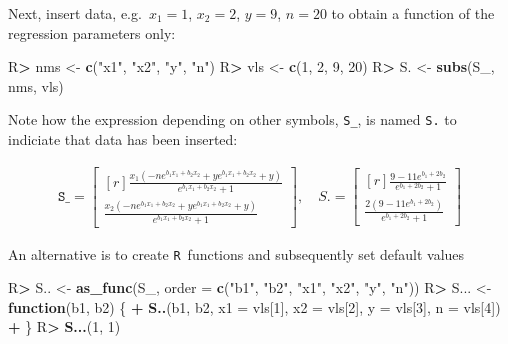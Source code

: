 \documentclass[10pt,]{article}
\newenvironment{Shaded}{\begin{snugshade}}{\end{snugshade}}
\newcommand{\ControlFlowTok}[1]{\textcolor[rgb]{0.13,0.29,0.53}{\textbf{#1}}}
\newcommand{\DataTypeTok}[1]{\textcolor[rgb]{0.13,0.29,0.53}{#1}}
\newcommand{\DecValTok}[1]{\textcolor[rgb]{0.00,0.00,0.81}{#1}}
\newcommand{\KeywordTok}[1]{\textcolor[rgb]{0.13,0.29,0.53}{\textbf{#1}}}
\newcommand{\NormalTok}[1]{#1}
\newcommand{\OperatorTok}[1]{\textcolor[rgb]{0.81,0.36,0.00}{\textbf{#1}}}
\newcommand{\StringTok}[1]{\textcolor[rgb]{0.31,0.60,0.02}{#1}}
\begin{document}
Next, insert data, e.g.~\(x_{1}=1\), \(x_{2}=2\), \(y=9\), \(n=20\) to
obtain a function of the regression parameters only:

\begin{Shaded}
\begin{Highlighting}[]
\NormalTok{R}\OperatorTok{>}\StringTok{ }\NormalTok{nms <-}\StringTok{ }\KeywordTok{c}\NormalTok{(}\StringTok{"x1"}\NormalTok{, }\StringTok{"x2"}\NormalTok{, }\StringTok{"y"}\NormalTok{, }\StringTok{"n"}\NormalTok{)}
\NormalTok{R}\OperatorTok{>}\StringTok{ }\NormalTok{vls <-}\StringTok{ }\KeywordTok{c}\NormalTok{(}\DecValTok{1}\NormalTok{, }\DecValTok{2}\NormalTok{, }\DecValTok{9}\NormalTok{, }\DecValTok{20}\NormalTok{)}
\NormalTok{R}\OperatorTok{>}\StringTok{ }\NormalTok{S. <-}\StringTok{ }\KeywordTok{subs}\NormalTok{(S_, nms, vls)}
\end{Highlighting}
\end{Shaded}

Note how the expression depending on other symbols, \texttt{S\_}, is
named \texttt{S.} to indiciate that data has been inserted:

\begin{align}
\texttt{S\_} = \left[\begin{matrix}[r]\frac{x_{1} \left(- n e^{b_{1} x_{1} + b_{2} x_{2}} + y e^{b_{1} x_{1} + b_{2} x_{2}} + y\right)}{e^{b_{1} x_{1} + b_{2} x_{2}} + 1}\\\frac{x_{2} \left(- n e^{b_{1} x_{1} + b_{2} x_{2}} + y e^{b_{1} x_{1} + b_{2} x_{2}} + y\right)}{e^{b_{1} x_{1} + b_{2} x_{2}} + 1}\end{matrix}\right], \quad S. = \left[\begin{matrix}[r]\frac{9 - 11 e^{b_{1} + 2 b_{2}}}{e^{b_{1} + 2 b_{2}} + 1}\\\frac{2 \left(9 - 11 e^{b_{1} + 2 b_{2}}\right)}{e^{b_{1} + 2 b_{2}} + 1}\end{matrix}\right]
\end{align}

An alternative is to create \texttt{R}\ functions and subsequently set
default values

\begin{Shaded}
\begin{Highlighting}[]
\NormalTok{R}\OperatorTok{>}\StringTok{ }\NormalTok{S.. <-}\StringTok{ }\KeywordTok{as_func}\NormalTok{(S_, }\DataTypeTok{order =} \KeywordTok{c}\NormalTok{(}\StringTok{"b1"}\NormalTok{, }\StringTok{"b2"}\NormalTok{, }\StringTok{"x1"}\NormalTok{, }\StringTok{"x2"}\NormalTok{, }\StringTok{"y"}\NormalTok{, }\StringTok{"n"}\NormalTok{))}
\NormalTok{R}\OperatorTok{>}\StringTok{ }\NormalTok{S... <-}\StringTok{ }\ControlFlowTok{function}\NormalTok{(b1, b2) \{}
\OperatorTok{+}\StringTok{   }\KeywordTok{S..}\NormalTok{(b1, b2, }\DataTypeTok{x1 =}\NormalTok{ vls[}\DecValTok{1}\NormalTok{], }\DataTypeTok{x2 =}\NormalTok{ vls[}\DecValTok{2}\NormalTok{], }\DataTypeTok{y =}\NormalTok{ vls[}\DecValTok{3}\NormalTok{], }\DataTypeTok{n =}\NormalTok{ vls[}\DecValTok{4}\NormalTok{])}
\OperatorTok{+}\StringTok{ }\NormalTok{\}}
\NormalTok{R}\OperatorTok{>}\StringTok{ }\KeywordTok{S...}\NormalTok{(}\DecValTok{1}\NormalTok{, }\DecValTok{1}\NormalTok{)}
\end{Highlighting}
\end{Shaded}
\end{document}
